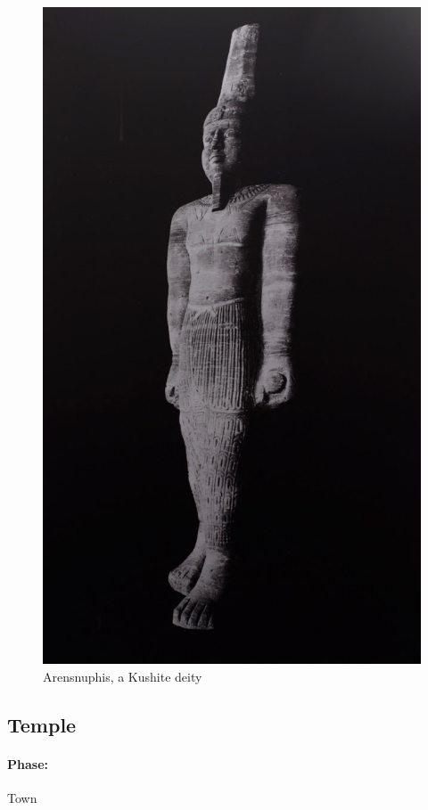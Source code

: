 \documentclass[a4paper,12pt]{scrreprt}
\begin{document}
\begin{figure}[H]
	\centering
	\includegraphics[width=\textwidth]{img/market/arensnuphis_statue}
	\caption{Arensnuphis, a Kushite deity}
\end{figure}

\subsection{Temple}

\paragraph{Phase:} Town\\
\end{document}
